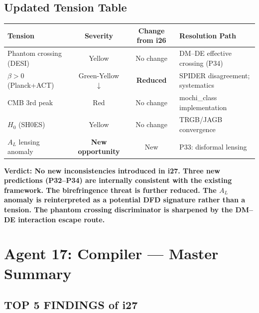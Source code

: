 \documentclass[11pt,a4paper]{article}
\begin{document}
\subsection{Updated Tension Table}

\begin{center}
\begin{tabular}{lccl}
\toprule
\textbf{Tension} & \textbf{Severity} & \textbf{Change from i26} & \textbf{Resolution Path} \\
\midrule
Phantom crossing (DESI) & Yellow & No change & DM--DE effective crossing (P34) \\
$\beta > 0$ (Planck+ACT) & Green-Yellow $\downarrow$ & \textbf{Reduced} & SPIDER disagreement; systematics \\
CMB 3rd peak & Red & No change & mochi\_class implementation \\
$H_0$ (SH0ES) & Yellow & No change & TRGB/JAGB convergence \\
$A_L$ lensing anomaly & \textbf{New opportunity} & New & P33: disformal lensing \\
\bottomrule
\end{tabular}
\end{center}

\textbf{Verdict: No new inconsistencies introduced in i27. Three new predictions (P32--P34) are internally consistent with the existing framework. The birefringence threat is further reduced. The $A_L$ anomaly is reinterpreted as a potential DFD signature rather than a tension. The phantom crossing discriminator is sharpened by the DM--DE interaction escape route.}

\section{Agent 17: Compiler --- Master Summary}

\subsection{TOP 5 FINDINGS of i27}
\end{document}

